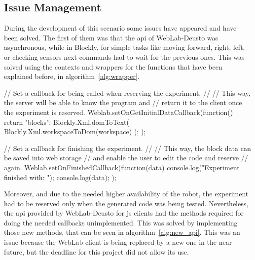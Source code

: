 \FloatBarrier

\subsection{Issue Management}

During the development of this scenario some issues have appeared and have been solved. The first of
them was that the \acrshort{api} of WebLab-Deusto was asynchronous, while in Blockly, for simple
tasks like moving forward, right, left, or checking sensors next commands had to wait for the
previous ones. This was solved using the contexts and wrappers for the functions that have been
explained before, in algorithm~\ref{alg:wrapper}.

\begin{center}
\begin{minipage}{.9\textwidth}
\singlespace
{}
\begin{pyglist}[language=javascript, caption={New WebLab \acrshort{api} functions.},
	label={alg:new_api}, listingname={Algorithm}, numbers=left]
// Set a callback for being called when reserving the experiment.
//
// This way, the server will be able to know the program and
// return it to the client once the experiment is reserved.
Weblab.setOnGetInitialDataCallback(function() {
    return {"blocks": Blockly.Xml.domToText(
        Blockly.Xml.workspaceToDom(workspace)
    )};
});

// Set a callback for finishing the experiment.
//
// This way, the block data can be saved into web storage
// and enable the user to edit the code and reserve
// again.
Weblab.setOnFinishedCallback(function(data) {
    console.log("Experiment finished with: ");
    console.log(data);
});
\end{pyglist}
\end{minipage}
\end{center}

Moreover, and due to the needed higher availability of the robot, the experiment had to be reserved
only when the generated code was being tested. Nevertheless, the \acrshort{api} provided by
WebLab-Deusto for \acrlong{js} clients had the methods required for doing the needed callbacks
unimplemented. This was solved by implementing those new methods, that can be seen in
algorithm~\ref{alg:new_api}. This was an issue because the WebLab client is being replaced by a new
one in the near future, but the deadline for this project did not allow its use.
